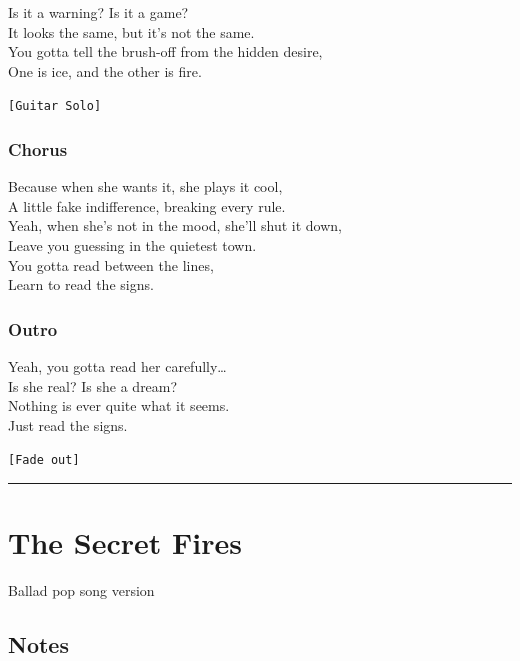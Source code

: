 \hspace{0pt}Is it a warning? Is it a game?\\
It looks the same, but it's not the same.\\
You gotta tell the brush-off from the hidden desire,\\
One is ice, and the other is fire.

\texttt{{[}\hspace{0pt}Guitar\ Solo{]}}

\subsubsection{Chorus}\label{chorus-2}

\hspace{0pt}Because when she wants it, she plays it cool,\\
A little fake indifference, breaking every rule.\\
Yeah, when she's not in the mood, she'll shut it down,\\
Leave you guessing in the quietest town.\\
You gotta read between the lines,\\
Learn to read the signs.

\subsubsection{Outro}\label{outro}

\hspace{0pt}Yeah, you gotta read her carefully\ldots{}\\
Is she real? Is she a dream?\\
Nothing is ever quite what it seems.\\
Just read the signs.

\texttt{{[}Fade\ out{]}}

\begin{center}\rule{0.5\linewidth}{0.5pt}\end{center}

\section{The Secret Fires}\label{the-secret-fires}

Ballad pop song version

\subsection{Notes}\label{notes-1}

